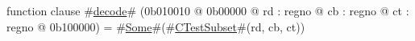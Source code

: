 function clause #\hyperref[zdecode]{decode}# (0b010010 @ 0b00000 @ rd : regno @ cb : regno @ ct : regno @ 0b100000) = #\hyperref[zSome]{Some}#(#\hyperref[zCTestSubset]{CTestSubset}#(rd, cb, ct))
